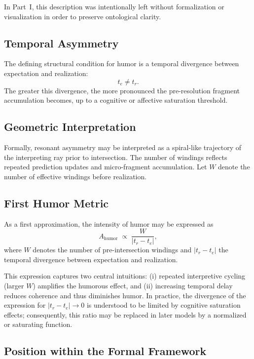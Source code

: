 \documentclass[12pt,a4paper]{article}
\begin{document}
In Part~I, this description was intentionally left without
formalization or visualization in order to preserve ontological clarity.

\subsection{Temporal Asymmetry}

The defining structural condition for humor is a temporal divergence
between expectation and realization:
\[
t_e \neq t_r.
\]
The greater this divergence, the more pronounced the pre-resolution
fragment accumulation becomes, up to a cognitive or affective saturation
threshold.

\subsection{Geometric Interpretation}

Formally, resonant asymmetry may be interpreted as a spiral-like
trajectory of the interpreting ray prior to intersection.
The number of windings reflects repeated prediction updates and
micro-fragment accumulation.
Let $W$ denote the number of effective windings before realization.

\subsection{First Humor Metric}

As a first approximation, the intensity of humor may be expressed as
\begin{equation}
A_{\text{humor}} \;\propto\; \frac{W}{\lvert t_r - t_e \rvert},
\end{equation}
where $W$ denotes the number of pre-intersection windings and
$\lvert t_r - t_e \rvert$ the temporal divergence between expectation and realization.

This expression captures two central intuitions:
(i) repeated interpretive cycling (larger $W$) amplifies the humorous effect, and
(ii) increasing temporal delay reduces coherence and thus diminishes humor.
In practice, the divergence of the expression for $\lvert t_r - t_e \rvert \to 0$ is
understood to be limited by cognitive saturation effects; consequently, this ratio
may be replaced in later models by a normalized or saturating function.

\subsection{Position within the Formal Framework}
\end{document}
